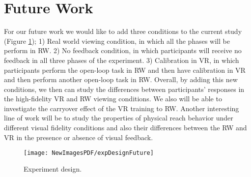 \section{Future Work}
For our future work we would like to add three conditions to the current study (Figure \ref{fig:FutureExpDesign}); 1) Real world viewing condition, in which all the phases will be perform in RW. 2) No feedback condition, in which participants will receive no feedback in all three phases of the experiment. 3) Calibration in VR, in which participants perform the open-loop task in RW and then have calibration in VR and then perform another open-loop task in RW.
Overall, by adding this new conditions, we then can study the differences between participants' responses in the high-fidelity VR and RW viewing conditions. We also will be able to investigate the carryover effect of the VR training to RW. Another interesting line of work will be to study the properties of physical reach behavior under different visual fidelity conditions and also their differences between the RW and VR in the presence or absence of visual feedback.

\begin{figure}
	\centering
	\texttt{[image: NewImagesPDF/expDesignFuture]}
	\caption{Experiment design.}
	\label{fig:FutureExpDesign}
\end{figure}